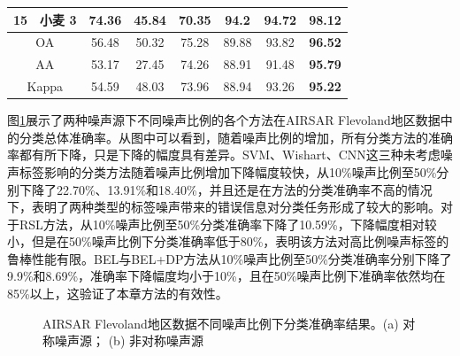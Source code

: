 \begin{table}[ht!]
\begin{tabular}{cccccccc}
        15                        & 小麦 3  & 74.36 & 45.84   & 70.35 & 94.2           & 94.72          & \textbf{98.12} \\
        \midrule[0.75bp]
        \multicolumn{2}{c}{OA}    & 56.48 & 50.32 & 75.28   & 89.88 & 93.82          & \textbf{96.52}                  \\
        \multicolumn{2}{c}{AA}    & 53.17 & 27.45 & 74.26   & 88.91 & 91.48          & \textbf{95.79}                  \\
        \multicolumn{2}{c}{Kappa} & 54.59 & 48.03 & 73.96   & 88.94 & 93.26          & \textbf{95.22}                  \\
        \bottomrule[1.5bp]
    \end{tabular}
\end{table}

图\ref{fig:fle_noise}展示了两种噪声源下不同噪声比例的各个方法在AIRSAR Flevoland地区数据中的分类总体准确率。从图中可以看到，随着噪声比例的增加，所有分类方法的准确率都有所下降，只是下降的幅度具有差异。SVM、Wishart、CNN这三种未考虑噪声标签影响的分类方法随着噪声比例增加下降幅度较快，从10\%噪声比例至50\%分别下降了22.70\%、13.91\%和18.40\%，并且还是在方法的分类准确率不高的情况下，表明了两种类型的标签噪声带来的错误信息对分类任务形成了较大的影响。对于RSL方法，从10\%噪声比例至50\%分类准确率下降了10.59\%，下降幅度相对较小，但是在50\%噪声比例下分类准确率低于80\%，表明该方法对高比例噪声标签的鲁棒性能有限。BEL与BEL+DP方法从10\%噪声比例至50\%分类准确率分别下降了9.9\%和8.69\%，准确率下降幅度均小于10\%，且在50\%噪声比例下准确率依然均在85\%以上，这验证了本章方法的有效性。
\begin{figure}[ht!]
    \caption{AIRSAR Flevoland地区数据不同噪声比例下分类准确率结果。(a) 对称噪声源； (b) 非对称噪声源}
    \label{fig:fle_noise}
\end{figure}

